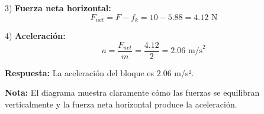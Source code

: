 \begin{ejercicio}
\begin{solucion}
3) \textbf{Fuerza neta horizontal:}
   $$F_{net} = F - f_k = 10 - 5.88 = 4.12 \text{ N}$$

4) \textbf{Aceleración:}
   $$a = \frac{F_{net}}{m} = \frac{4.12}{2} = 2.06 \text{ m/s}^2$$

\textbf{Respuesta:} La aceleración del bloque es $2.06$ m/s².

\textbf{Nota:} El diagrama muestra claramente cómo las fuerzas se equilibran verticalmente y la fuerza neta horizontal produce la aceleración.
\end{solucion}
\end{ejercicio} 